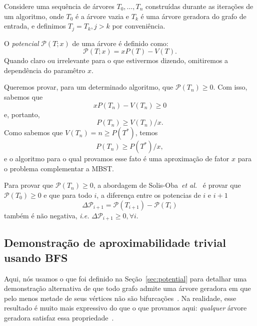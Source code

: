 \documentclass[conference]{IEEEtran}
\begin{document}
Considere uma sequ\^encia de \'arvores $T_0, \dots, T_n$ constru\'idas durante as itera\c{c}\~oes
de um algoritmo, onde $T_0$ \'e a \'arvore vazia e $T_k$ \'e uma \'arvore geradora do grafo de
entrada, e definimos $T_j = T_k, j > k$ por conveni\^encia.

O \emph{potencial} $\mathcal{P}(T; x)$ de uma \'arvore \'e definido como:
\begin{equation}
  \mathcal{P}(T; x) = xP(T) - V(T).
\end{equation}
Quando claro ou irrelevante para o que estivermos dizendo, omitiremos a depend\^encia do param\^etro
$x$.

Queremos provar, para um determinado algoritmo, que $\mathcal{P}(T_n) \ge 0$. Com isso, sabemos que
\begin{equation}
   xP(T_n) - V(T_n) \ge 0
\end{equation}
e, portanto,
\begin{equation} \label{eq:tigher-bound}
  P(T_n) \ge V(T_n)/x.
\end{equation}
Como sabemos que $V(T_n) = n \ge P(T^*)$, temos
\begin{equation} \label{eq:pot-obj}
  P(T_n) \ge P(T^*)/x,
\end{equation}
e o algoritmo para o qual provamos esse fato \'e uma aproxima\c{c}\~ao de fator $x$ para o problema
complementar a MBST.

Para provar que $\mathcal{P}(T_n) \ge 0$, a abordagem de
Solis-Oba~\textit{et al.}~\cite{solis-oba2017} \'e provar que $\mathcal{P}(T_0) \ge 0$ e que para
todo $i$, a diferen\c{c}a entre os potencias de $i$ e $i+1$
\begin{equation}
  \Delta \mathcal{P}_{i + 1} = \mathcal{P}(T_{i + 1}) - \mathcal{P}(T_i)
\end{equation}
tamb\'em \'e n\~ao negativa, \textit{i.e.} $\Delta \mathcal{P}_{i + 1} \ge 0, \forall i$.

\subsection{Demonstra\c{c}\~ao de aproximabilidade trivial usando BFS}

Aqui, n\'os usamos o que foi definido na Se\c{c}\~ao~\ref{sec:potential} para detalhar uma
demonstra\c{c}\~ao alternativa de que todo grafo admite uma \'arvore geradora em que pelo menos
metade de seus v\'ertices n\~ao s\~ao bifurca\c{c}\~oes~\cite{chimani2015}.
Na realidade, esse resultado \'e muito mais expressivo do que o que provamos aqui: \emph{qualquer}
\'arvore geradora satisfaz essa propriedade~\cite{chimani2015}.
\end{document}
